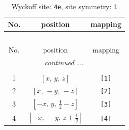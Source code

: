 \documentclass[fleqn,8pt]{jsarticle}
\begin{document}
\begin{longtable}{ccc}
\caption{Wyckoff site: {\tt 4e}, site symmetry: {\tt 1}}
 \\
 \hline \hline
No. & position & mapping \\ \hline \endfirsthead

\multicolumn{2}{l}{\tablename\ \thetable{}} \\
 \hline \hline
No. & position & mapping \\ \hline \endhead

 \hline \hline
\multicolumn{2}{r}{\footnotesize\it continued ...} \\ \endfoot

 \hline \hline
\multicolumn{2}{r}{} \\ \endlastfoot

1 & $\left[ x,\, y,\, z \right]$ & {\tt [1]} \\ \hline
2 & $\left[ x,\, - y,\, - z \right]$ & {\tt [2]} \\ \hline
3 & $\left[ - x,\, y,\, \frac{1}{2} - z \right]$ & {\tt [3]} \\ \hline
4 & $\left[ - x,\, - y,\, z + \frac{1}{2} \right]$ & {\tt [4]} \\
\end{longtable}
\end{document}

